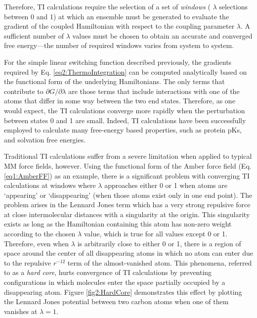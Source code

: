 Therefore, TI calculations require the selection of a set of \emph{windows} (\ie
$\lambda$ selections between 0 and 1) at which an ensemble must be generated to
evaluate the gradient of the coupled Hamiltonian with respect to the coupling
parameter $\lambda$. A sufficient number of $\lambda$ values must be chosen to
obtain an accurate and converged free energy---the number of required windows
varies from system to system.

For the simple linear switching function described previously, the gradients
required by Eq. \ref{eq2:ThermoIntegration} can be computed analytically based
on the functional form of the underlying Hamiltonians. The only terms that
contribute to $\partial G / \partial \lambda$ are those terms that include
interactions with one of the atoms that differ in some way between the two end
states. Therefore, as one would expect, the TI calculations converge more
rapidly when the perturbation between states 0 and 1 are small. Indeed, TI
calculations have been successfully employed to calculate many free-energy based
properties, such as protein pKs, \cite{Davies_JAmChemSoc_2002_v124_p6594}
and solvation free energies. \cite{Steinbrecher2011}

Traditional TI calculations suffer from a severe limitation when applied to
typical MM force fields, however. Using the functional form of the Amber force
field (Eq. \ref{eq1:AmberFF}) as an example, there is a significant problem with
converging TI calculations at windows where $\lambda$ approaches either 0 or 1
when atoms are `appearing' or `disappearing' (\ie when those atoms exist only in
one end point). The problem arises in the Lennard Jones term which has a very
strong repulsive force at close intermolecular distances with a singularity at
the origin. This singularity exists as long as the Hamiltonian containing this
atom has non-zero weight according to the chosen $\lambda$ value, which is true
for all values except 0 or 1. Therefore, even when $\lambda$ is arbitrarily
close to either 0 or 1, there is a region of space around the center of all
disappearing atoms in which no atom can enter due to the repulsive $r^{-12}$
term of the almost-vanished atom. This phenomena, referred to as a
\emph{hard core}, hurts convergence of TI calculations by preventing
configurations in which molecules enter the space partially occupied by a
disappearing atom. \cite{Beutler_ChemPhysLett_1994_v222_p529} Figure
\ref{fig2:HardCore} demonstrates this effect by plotting the Lennard Jones
potential between two carbon atoms when one of them vanishes at $\lambda=1$.


